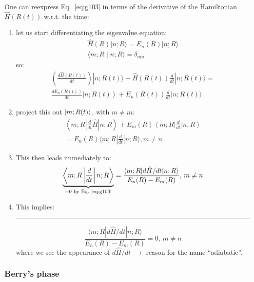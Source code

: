 \documentclass[12pt]{article}
\newcommand{\be}{\begin{equation}}
\newcommand{\ee}{\end{equation}}
\begin{document}
One can reexpress  Eq.~\eqref{eq:g103} in terms of the derivative
of the Hamiltonian $\hat{H}(R(t))$ w.r.t. the time:
\begin{enumerate}
\item let us start differentiating the eigenvalue
equation:
\[
\begin{gathered}
\hat{H}(R)|n ; R\rangle=E_{n}(R)|n ; R\rangle\\
\langle m ; R \mid n ; R\rangle=\delta_{m n}
\end{gathered}
\] 
so:
\be
\begin{gathered}
\left(\frac{d \hat{H}(R(t))}{d t}\right)|n ; R(t)\rangle+\hat{H}(R(t)) \frac{d}{d t}|n ; R(t)\rangle= \\ 
\frac{d E_{n}(R(t))}{d t}\left|n ; R(t)\right\rangle+E_{n}(R(t)) \frac{d}{d t}|n ; R(t)\rangle
\end{gathered}
\ee
%
\item project this out $\ket{m;R(t)}$, with $ m\neq m$:
\be
\begin{gathered}
\left\langle m ; R\left|\frac{d}{d t} \hat{H}\right| n ; R\right\rangle+E_{m}(R)\left\langle m ; R\right| \frac{d}{d t}\left| n ; R\right\rangle \\ 
=E_{n}(R)\langle m ; R| \frac{d}{d t}|n ; R\rangle, m \neq n 
\end{gathered}
\ee
\item This then leads immediately to:
\be
\underbrace{\left\langle m ; R\left|\frac{d}{d t}\right| n ; R\right\rangle}%
_{=0\text{ by Eq.~\eqref{eq:g103}}}
=\frac{\langle m ; R|d \hat{H} / d t| n ; R\rangle}{E_{n}(R)-E_{m}(R)},\,m \neq n
\ee
%
\item This implies:\\
\rule{\textwidth}{1pt}
\be
\frac{\langle m ; R|d \hat{H} / d t| n ; R\rangle}{E_{n}(R)-E_{m}(R)} = 0,\,m \neq n
\label{eq:g108}
\ee
where we see the appearance of $d \hat{H} / d t$ $\rightarrow$ reason for the name ``adiabatic''.
\end{enumerate}

\subsubsection{Berry's phase}
\end{document}
